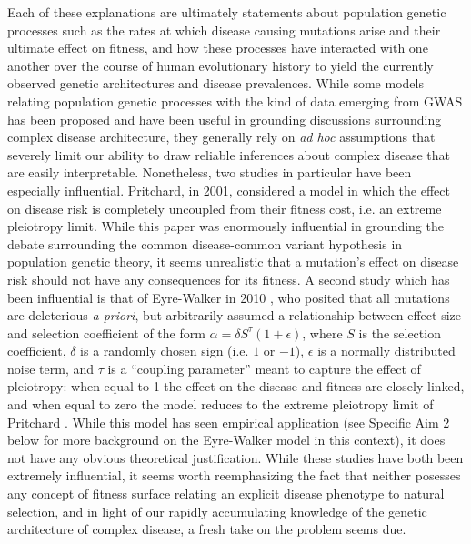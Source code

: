 \documentclass[11pt]{article}
\begin{document}
Each of these explanations are ultimately statements about population genetic processes such as the rates at which disease causing mutations arise and their ultimate effect on fitness, and how these processes have interacted with one another over the course of human evolutionary history to yield the currently observed genetic architectures and disease prevalences. While some models relating population genetic processes with the kind of data emerging from GWAS has been proposed and have been useful in grounding discussions surrounding complex disease architecture, they generally rely on \textit{ad hoc} assumptions that severely limit our ability to draw reliable inferences about complex disease that are easily interpretable. Nonetheless, two studies in particular have been especially influential. Pritchard, in 2001\cite{Pritchard:2001hw}, considered a model in which the effect on disease risk is completely uncoupled from their fitness cost, i.e. an extreme pleiotropy limit. While this paper was enormously influential in grounding the debate surrounding the common disease-common variant hypothesis in population genetic theory\cite{Pritchard:2002ux}, it seems unrealistic that a mutation's effect on disease risk should not have any consequences for its fitness. A second study which has been influential is that of Eyre-Walker in 2010 \cite{EyreWalker:2010dn}, who posited that all mutations are deleterious \textit{a priori}, but arbitrarily assumed a relationship between effect size and selection coefficient of the form $\alpha =\delta S^\tau (1+\epsilon)$, where $S$ is the selection coefficient, $\delta$ is a randomly chosen sign (i.e. $1$ or $-1$), $\epsilon$ is a normally distributed noise term, and $\tau$ is a ``coupling parameter'' meant to capture the effect of pleiotropy: when equal to 1 the effect on the disease and fitness are closely linked, and when equal to zero the model reduces to the extreme pleiotropy limit of Pritchard \cite{Pritchard:2001hw}. While this model has seen empirical application (see Specific Aim 2 below for more background on the Eyre-Walker model in this context), it does not have any obvious theoretical justification. While these studies have both been extremely influential, it seems worth reemphasizing the fact that neither posesses any concept of fitness surface relating an explicit disease phenotype to natural selection, and in light of our rapidly accumulating knowledge of the genetic architecture of complex disease, a fresh take on the problem seems due. 
\end{document}
